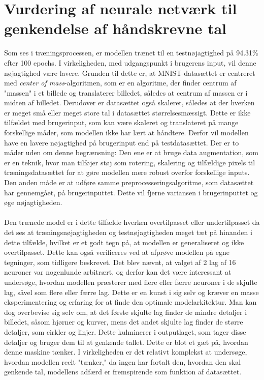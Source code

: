 \documentclass{article}
\begin{document}
\section{Vurdering af neurale netværk til genkendelse af håndskrevne tal}
Som ses i træningsprocessen, er modellen trænet til en testnøjagtighed på 94.31\% efter 100 epochs. I virkeligheden, med udgangspunkt i brugerens input, vil denne nøjagtighed være lavere. Grunden til dette er, at MNIST-datasættet er centreret med \textit{center of mass}-algoritmen, som er en algoritme, der finder centrum af "massen" i et billede og translaterer billedet, således at centrum af massen er i midten af billedet. Derudover er datasættet også skaleret, således at der hverken er meget små eller meget store tal i datasættet størrelsesmæssigt. Dette er ikke tilfældet med brugerinput, som kan være skaleret og translateret på mange forskellige måder, som modellen ikke har lært at håndtere. Derfor vil modellen have en lavere nøjagtighed på brugerinput end på testdatasættet. Der er to måder uden om denne begrænsning: Den ene er at bruge data augmentation, som er en teknik, hvor man tilføjer støj som rotering, skalering og tilfældige pixels til træningsdatasættet for at gøre modellen mere robust overfor forskellige inputs. Den anden måde er at udføre samme preprocesseringsalgoritme, som datasættet har gennemgået, på brugerinputtet. Dette vil fjerne variansen i brugerinputtet og øge nøjagtigheden.\\\\
Den trænede model er i dette tilfælde hverken overtilpasset eller undertilpasset da det ses at træningsnøjagtigheden og testnøjagtigheden meget tæt på hinanden i dette tilfælde, hvilket er et godt tegn på, at modellen er generaliseret og ikke overtilpasset. Dette kan også verificeres ved at afprøve modellen på egne tegninger, som tidligere beskrevet. Det blev nævnt, at valget af 2 lag af 16 neuroner var nogenlunde arbitrært, og derfor kan det være interessant at undersøge, hvordan modellen præsterer med flere eller færre neuroner i de skjulte lag, såvel som flere eller færre lag. Dette er en kunst i sig selv og kræver en masse eksperimentering og erfaring for at finde den optimale modelarkitektur. Man kan dog overbevise sig selv om, at det første skjulte lag finder de mindre detaljer i billedet, såsom hjørner og kurver, mens det andet skjulte lag finder de større detaljer, som cirkler og linjer. Dette kulminerer i outputlaget, som tager disse detaljer og bruger dem til at genkende tallet. \parencite{Sanderson_2017} Dette er blot et gæt på, hvordan denne maskine tænker. I virkeligheden er det relativt komplekst at undersøge, hvordan modellen reelt "tænker," da ingen har fortalt den, hvordan den skal genkende tal, modellens adfærd er fremspirende som funktion af datasættet.\\\\
\end{document}
